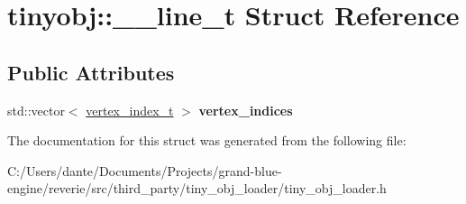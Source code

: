 \hypertarget{structtinyobj_1_1____line__t}{}\section{tinyobj\+::\+\_\+\+\_\+line\+\_\+t Struct Reference}
\label{structtinyobj_1_1____line__t}
\subsection*{Public Attributes}
\begin{DoxyCompactItemize}
\item 
\mbox{\label{structtinyobj_1_1____line__t_aac7adb2c67ed2a271d8f32f20c003a8c}} 
std\+::vector$<$ \mbox{\hyperlink{structtinyobj_1_1vertex__index__t}{vertex\+\_\+index\+\_\+t}} $>$ {\bfseries vertex\+\_\+indices}
\end{DoxyCompactItemize}


The documentation for this struct was generated from the following file\+:\begin{DoxyCompactItemize}
\item 
C\+:/\+Users/dante/\+Documents/\+Projects/grand-\/blue-\/engine/reverie/src/third\+\_\+party/tiny\+\_\+obj\+\_\+loader/tiny\+\_\+obj\+\_\+loader.\+h\end{DoxyCompactItemize}
